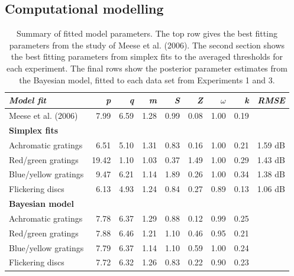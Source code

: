 \documentclass[
]{article}
\begin{document}
\hypertarget{computational-modelling}{%
\subsection{Computational modelling}\label{computational-modelling}}

\begin{table}

\caption{\label{tab:parametertable}Summary of fitted model parameters. The top row gives the best fitting parameters from the study of Meese et al. (2006). The second section shows the best fitting parameters from simplex fits to the averaged thresholds for each experiment. The final rows show the posterior parameter estimates from the Bayesian model, fitted to each data set from Experiments 1 and 3.}
\centering
\begin{tabular}[t]{lrrrrrrrr}
\toprule
\textbf{\em{Model fit}} & \textbf{\em{p}} & \textbf{\em{q}} & \textbf{\em{m}} & \textbf{\em{S}} & \textbf{\em{Z}} & \textbf{\em{$\omega$}} & \textbf{\em{k}} & \textbf{\em{RMSE}}\\
\midrule
Meese et al. (2006) & 7.99 & 6.59 & 1.28 & 0.99 & 0.08 & 1.00 & 0.19 & \\
\midrule
\textbf{Simplex fits} & \textbf{} & \textbf{} & \textbf{} & \textbf{} & \textbf{} & \textbf{} & \textbf{} & \textbf{}\\
Achromatic gratings & 6.51 & 5.10 & 1.31 & 0.83 & 0.16 & 1.00 & 0.21 & 1.59 dB\\
Red/green gratings & 19.42 & 1.10 & 1.03 & 0.37 & 1.49 & 1.00 & 0.29 & 1.43 dB\\
Blue/yellow gratings & 9.47 & 6.21 & 1.14 & 1.89 & 0.26 & 1.00 & 0.34 & 1.38 dB\\
Flickering discs & 6.13 & 4.93 & 1.24 & 0.84 & 0.27 & 0.89 & 0.13 & 1.06 dB\\
\midrule
\textbf{Bayesian model} & \textbf{} & \textbf{} & \textbf{} & \textbf{} & \textbf{} & \textbf{} & \textbf{} & \textbf{}\\
Achromatic gratings & 7.78 & 6.37 & 1.29 & 0.88 & 0.12 & 0.99 & 0.25 & \\
Red/green gratings & 7.88 & 6.46 & 1.21 & 1.10 & 0.46 & 0.95 & 0.21 & \\
Blue/yellow gratings & 7.79 & 6.37 & 1.14 & 1.10 & 0.59 & 1.00 & 0.24 & \\
Flickering discs & 7.72 & 6.32 & 1.26 & 0.83 & 0.22 & 0.90 & 0.23 & \\
\bottomrule
\end{tabular}
\end{table}
\end{document}
